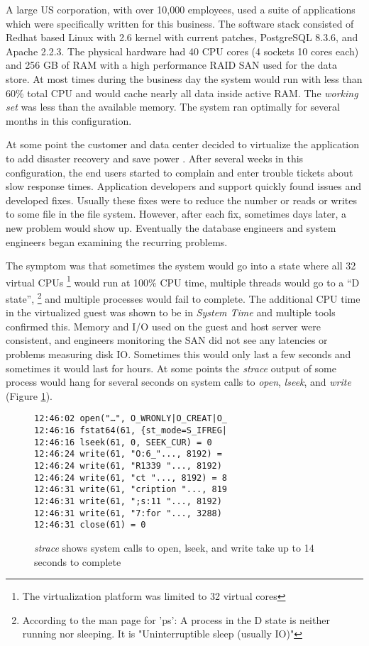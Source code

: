A large US corporation, with over 10,000 employees, used a suite of applications which were specifically written for this business. The software stack consisted of Redhat based Linux with 2.6 kernel with current patches, PostgreSQL 8.3.6, and Apache 2.2.3.  The physical hardware had 40 CPU cores (4 sockets 10 cores each) and 256 GB of RAM with a high performance RAID SAN used for the data store.  At most times during the business day the system would run with less than 60\% total CPU and would cache nearly all data inside active RAM.  The \emph{working set} was less than the available memory.  The system ran optimally for several months in this configuration.

\indent At some point the customer and data center decided to virtualize the application to add disaster recovery \cite{wood} and save power \cite{lim}.  After several weeks in this configuration, the end users started to complain and enter trouble tickets about slow response times.  Application developers and support quickly found issues and developed fixes.   Usually these fixes were to reduce the number or reads or writes to some file in the file system.  However, after each fix, sometimes days later, a new problem would show up.  Eventually the database engineers and system engineers began examining the recurring problems.

\indent The symptom was that sometimes the system would go into a state where all 32 virtual CPUs \footnote{The virtualization platform was limited to 32 virtual cores} would run at 100\% CPU time, multiple threads would go to a “D state”, \footnote{According to the man page for 'ps':  A process in the D state is neither running nor sleeping.  It is "Uninterruptible sleep (usually IO)"} and multiple processes would fail to complete.  The additional CPU time in the virtualized guest was shown to be in \emph{System Time} and multiple tools confirmed this.  Memory and I/O used on the guest and host server were consistent, and engineers monitoring the SAN did not see any latencies or problems measuring disk IO.  Sometimes this would only last a few seconds and sometimes it would last for hours. At some points the \emph{strace} output of some process would hang for several seconds on system calls to \emph{open}, \emph{lseek}, and \emph{write} (Figure \ref{fig:syscall}).

\begin{figure}[h]
\begin{Verbatim}
12:46:02 open("…", O_WRONLY|O_CREAT|O_
12:46:16 fstat64(61, {st_mode=S_IFREG| 
12:46:16 lseek(61, 0, SEEK_CUR) = 0 
12:46:24 write(61, "O:6_"..., 8192) =  
12:46:24 write(61, "R1339 "..., 8192)  
12:46:24 write(61, "ct "..., 8192) = 8 
12:46:31 write(61, "cription "..., 819  
12:46:31 write(61, ";s:11 "..., 8192)  
12:46:31 write(61, "7:for "..., 3288)  
12:46:31 close(61) = 0
\end{Verbatim}
\caption{\emph{strace} shows system calls to open, lseek, and write take up to 14 seconds to complete}
\label{fig:syscall}
\end{figure}

